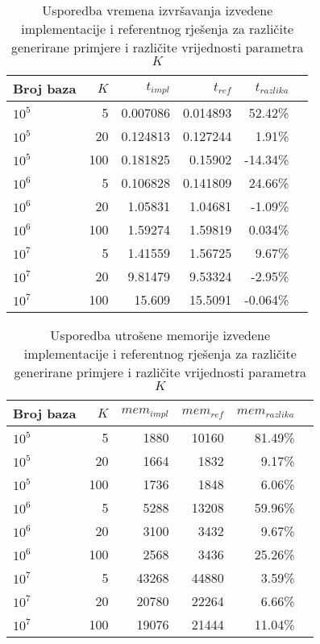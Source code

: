\documentclass[times, utf8, seminar, numeric]{fer}
\begin{document}
\begin{table}[h]
	\centering
	\caption{Usporedba vremena izvršavanja izvedene implementacije i referentnog rješenja za različite generirane primjere i različite vrijednosti parametra $K$}
	\label{tbl:results}
	
	\begin{tabular}{lrrrrr}
		\hline
        Broj baza & $K$ & $t_{impl}$ & $t_{ref}$ & $t_{razlika}$ \\ \hline
        $10^5$ & 5 & 0.007086 & 0.014893 & 52.42\% \\
        $10^5$ & 20 & 0.124813 & 0.127244 & 1.91\% \\
        $10^5$ & 100 & 0.181825 & 0.15902 & -14.34\% \\ \hline
        $10^6$ & 5 & 0.106828 & 0.141809 & 24.66\% \\
        $10^6$ & 20 & 1.05831 & 1.04681 & -1.09\% \\
        $10^6$ & 100 & 1.59274 & 1.59819 & 0.034\% \\ \hline
        $10^7$ & 5 & 1.41559 & 1.56725 & 9.67\% \\
        $10^7$ & 20 & 9.81479 & 9.53324 & -2.95\% \\
        $10^7$ & 100 & 15.609 & 15.5091 & -0.064\% \\
    \hline
	\end{tabular}
\end{table}

\begin{table}[h]
	\centering
	\caption{Usporedba utrošene memorije izvedene implementacije i referentnog rješenja za različite generirane primjere i različite vrijednosti parametra $K$}
	\label{tbl:results}
	
	\begin{tabular}{lrrrrr}
		\hline
        Broj baza & $K$ & $mem_{impl}$ & $mem_{ref}$ & $mem_{razlika}$ \\ \hline
        $10^5$ & 5 & 1880 & 10160 & 81.49\% \\
        $10^5$ & 20 & 1664 & 1832 & 9.17\% \\
        $10^5$ & 100 & 1736 & 1848 & 6.06\% \\ \hline
        $10^6$ & 5 & 5288 & 13208 & 59.96\% \\
        $10^6$ & 20 & 3100 & 3432 & 9.67\% \\
        $10^6$ & 100 & 2568 & 3436 & 25.26\% \\ \hline
        $10^7$ & 5 & 43268 & 44880 & 3.59\% \\
        $10^7$ & 20 & 20780 & 22264 & 6.66\% \\
        $10^7$ & 100 & 19076 & 21444 & 11.04\% \\
    \hline
	\end{tabular}
\end{table}
\end{document}
